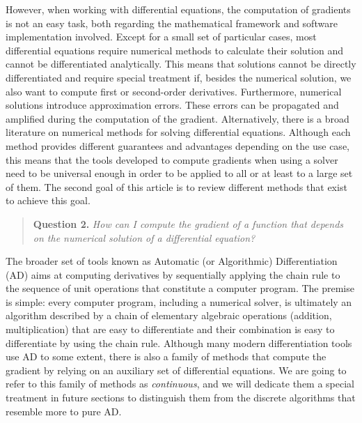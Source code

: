 However, when working with differential equations, the computation of gradients is not an easy task, both regarding the mathematical framework and software implementation involved. 
Except for a small set of particular cases, most differential equations require numerical methods to calculate their solution and cannot be differentiated analytically. 
This means that solutions cannot be directly differentiated and require special treatment if, besides the numerical solution, we also want to compute first or second-order derivatives. 
Furthermore, numerical solutions introduce approximation errors. 
These errors can be propagated and amplified during the computation of the gradient. 
Alternatively, there is a broad literature on numerical methods for solving differential equations. 
Although each method provides different guarantees and advantages depending on the use case, this means that the tools developed to compute gradients when using a solver need to be universal enough in order to be applied to all or 
at least to a large set of them. 
The second goal of this article is to review different methods that exist to achieve this goal.
\begin{quote}
    \textbf{Question 2. }
    \textit{How can I compute the gradient of a function that depends on the numerical solution of a differential equation?}
\end{quote}

The broader set of tools known as Automatic (or Algorithmic) Differentiation (AD) aims at computing derivatives by sequentially applying the chain rule to the sequence of unit operations that constitute a computer program\cite{Griewank:2008kh, Naumann.2011}. 
The premise is simple: every computer program, including a numerical solver, is ultimately an algorithm described by a chain of elementary algebraic operations (addition, multiplication) that are easy to differentiate and their combination is easy to differentiate by using the chain rule\cite{Giering:1998in}. 
Although many modern differentiation tools use AD to some extent, there is also a family of methods that compute the gradient by relying on an auxiliary set of differential equations. 
We are going to refer to this family of methods as \textit{continuous}, and we will dedicate them a special treatment in future sections to distinguish them from the discrete algorithms that resemble more to pure AD. 

